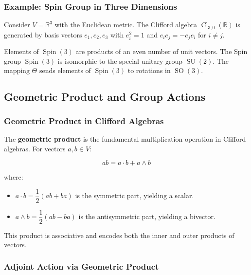 \documentclass[a4paper,14pt]{article}
\theoremstyle{plain} %
\theoremstyle{definition} %
\theoremstyle{remark} %
\theoremstyle{definition}
\theoremstyle{remark}
\theoremstyle{remark}
\begin{document}
	\subsubsection{Example: Spin Group in Three Dimensions}
	
	Consider \( V = \mathbb{R}^3 \) with the Euclidean metric. The Clifford algebra \( \operatorname{Cl}_{3,0}(\mathbb{R}) \) is generated by basis vectors \( e_1, e_2, e_3 \) with \( e_i^2 = 1 \) and \( e_i e_j = - e_j e_i \) for \( i \neq j \).
	
	Elements of \( \operatorname{Spin}(3) \) are products of an even number of unit vectors. The Spin group \( \operatorname{Spin}(3) \) is isomorphic to the special unitary group \( \operatorname{SU}(2) \). The mapping \( \Theta \) sends elements of \( \operatorname{Spin}(3) \) to rotations in \( \operatorname{SO}(3) \).
	
	\subsection{Geometric Product and Group Actions}
	
	\subsubsection{Geometric Product in Clifford Algebras}
	
	The \textbf{geometric product} is the fundamental multiplication operation in Clifford algebras. For vectors \( a, b \in V \):
	
	\begin{equation}
		\label{geometric_product}
		ab = a \cdot b + a \wedge b
	\end{equation}
	
	where:
	\begin{itemize}
		\item \( a \cdot b = \dfrac{1}{2}(ab + ba) \) is the symmetric part, yielding a scalar.
		\item \( a \wedge b = \dfrac{1}{2}(ab - ba) \) is the antisymmetric part, yielding a bivector.
	\end{itemize}
	
	This product is associative and encodes both the inner and outer products of vectors.
	
	\subsubsection{Adjoint Action via Geometric Product}
	
\end{document}
